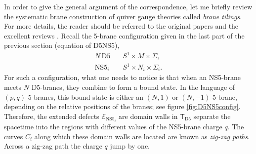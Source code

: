 In order to give the general argument of the correspondence, let me
briefly review the systematic brane construction of quiver gauge theories
called \emph{brane tilings}. For more details, the reader should be
referred to the original papers and the excellent reviews \cite{Hanany:2005ve,Franco:2005rj,Kennaway:2007tq,Yamazaki:2008bt}. Recall the 5-brane configuration given
in the last part of the previous section (equation of D5NS5), 
\begin{align*}
    N\,\mathrm{D5}    & \quad S^{1} \times M \times \Sigma,  \\
    \mathrm{NS5}_{i} & \quad S^{1} \times N_{i} \times \Sigma_{i}.
\end{align*}
For such a configuration, what one needs to notice is that when an
NS5-brane meets $N$ D5-branes, they combine to form a bound state.
In the language of $\left( p,q \right)$ 5-branes, this bound state
is either an $\left( N,1 \right)$ or $\left( N,-1 \right)$ 5-brane,
depending on the relative positions of the branes; see figure \ref{fig:D5NS5config}. Therefore,
the extended defects $\mathcal{E}_{\mathrm{NS5}_{i}}$ are domain
walls in $\mathsf{T}_{\mathrm{D5}}$ separate the spacetime into the
regions with different values of the NS5-brane charge $q$. The curves
$C_{i}$ along which these domain walls are located are known as \emph{zig-zag
paths}. Across a zig-zag path the charge $q$ jump by one. 


